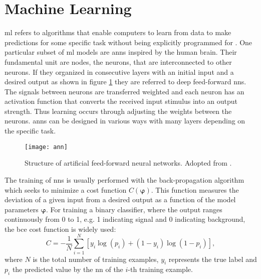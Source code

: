 
\section{Machine Learning}
\ac{ml} refers to algorithms that enable computers to learn from data to make predictions for some specific task without being explicitly programmed for \citep{kubat2021introduction}. One particular subset of \ac{ml} models are \acp{ann} inspired by the human brain. Their fundamental unit are nodes, the neurons, that are interconnected to other neurons. If they organized in consecutive layers with an initial input and a desired output as shown in figure \ref{fig:ann} they are referred to deep feed-forward \acp{nn}. The signals between neurons are transferred weighted and each neuron has an activation function that converts the received input stimulus into an output strength. Thus learning occurs through adjusting the weights between the neurons. \acp{ann} can be designed in various ways with many layers depending on the specific task.
\begin{figure}
    \centering
    \texttt{[image: ann]}
    \caption[]{Structure of artificial feed-forward neural networks. Adopted from \citep{8114708}.}
    \label{fig:ann}
\end{figure}

The training of \acp{nn} is usually performed with the back-propagation algorithm which seeks to minimize a cost function $C(\bm{\varphi})$. This function measures the deviation of a given input from a desired output as a function of the model parameters $\bm{\varphi}$. For training a binary classifier, where the output ranges continuously from 0 to 1, e.g. 1 indicating signal and 0 indicating background, the \ac{bce} cost function is widely used:
\begin{equation}\label{eq
}
C = -\frac{1}{N} \sum_{i=1}^{N} \left[ y_i \log(p_i) + (1 - y_i) \log(1 - p_i) \right],
\end{equation}
where $N$ is the total number of training examples, $y_i$ represents the true label and $p_i$ the predicted value by the \ac{nn} of the $i$-th training example.

